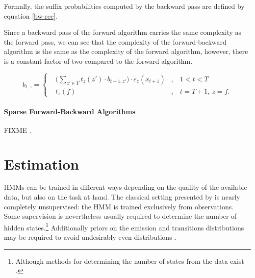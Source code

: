 Formally, the suffix probabilities computed by the backward pass are
defined by equation \eqref{bw-rec}.

Since a backward pass of the forward algorithm carries the same
complexity as the forward pass, we can see that the complexity of the
forward-backward algorithm is the same as the complexity of the
forward algorithm, however, there is a constant factor of two compared
to the forward algorithm.

\begin{equation}
b_{t, z} = \left\{
\begin{aligned}
&\Bigg(\sum_{z'\in Y}t_{z}(z') \cdot  b_{t + 1, z'} \Bigg) \cdot e_{z}(x_{t+1}) & ,&\ 1 < t < T\\
&t_{z}(f) & ,&\  t = T + 1,\ z = f.
\end{aligned}
\right.
\label{bw-rec}
\end{equation}

\paragraph{Sparse Forward-Backward Algorithms}
FIXME \citep{Pal2006}.

\section{Estimation}

HMMs can be trained in different ways depending on the quality of the
available data, but also on the task at hand. The classical setting
presented by \cite{Rabiner1989} is nearly completely unsupervised: the
HMM is trained exclusively from observations. Some supervision is
nevertheless usually required to determine the number of hidden
states.\footnote{Although methods for determining the number of states
  from the data exist \citep{foo}.} Additionally priors on the
emission and transitions distributions may be required to avoid
undesirably even distributions
\citep{Cutting1992,Johnson2007}.

